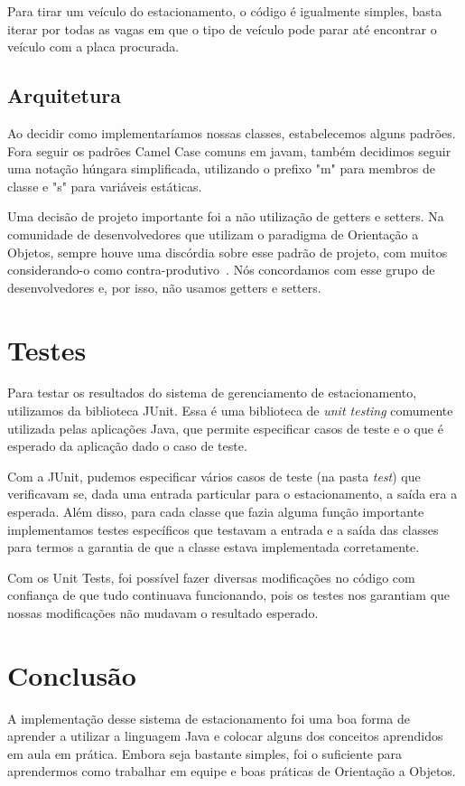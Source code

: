 \documentclass{article}
\begin{document}
Para tirar um veículo do estacionamento, o código é igualmente simples, basta iterar por todas as vagas em que o tipo de veículo pode parar até encontrar o veículo com a placa procurada.

\subsection{Arquitetura}
Ao decidir como implementaríamos nossas classes, estabelecemos alguns padrões. Fora seguir os padrões Camel Case comuns em javam, também decidimos seguir uma notação húngara simplificada, utilizando o prefixo "m" para membros de classe e "s" para variáveis estáticas. 

Uma decisão de projeto importante foi a não utilização de getters e setters. Na comunidade de desenvolvedores que utilizam o paradigma de Orientação a Objetos, sempre houve uma discórdia sobre esse padrão de projeto, com muitos considerando-o como contra-produtivo~\cite{evil}. Nós concordamos com esse grupo de desenvolvedores e, por isso, não usamos getters e setters.

\section{Testes}
Para testar os resultados do sistema de gerenciamento de estacionamento, utilizamos da biblioteca JUnit. Essa é uma biblioteca de \emph{unit testing} comumente utilizada pelas aplicações Java, que permite especificar casos de teste e o que é esperado da aplicação dado o caso de teste.

Com a JUnit, pudemos especificar vários casos de teste (na pasta \emph{test}) que verificavam se, dada uma entrada particular para o estacionamento, a saída era a esperada. Além disso, para cada classe que fazia alguma função importante implementamos testes específicos que testavam a entrada e a saída das classes para termos a garantia de que a classe estava implementada corretamente.

Com os Unit Tests, foi possível fazer diversas modificações no código com confiança de que tudo continuava funcionando, pois os testes nos garantiam que nossas modificações não mudavam o resultado esperado.

\section{Conclusão}
A implementação desse sistema de estacionamento foi uma boa forma de aprender a utilizar a linguagem Java e colocar alguns dos conceitos aprendidos em aula em prática. Embora seja bastante simples, foi o suficiente para aprendermos como trabalhar em equipe e boas práticas de Orientação a Objetos.

\nocite{*}


\end{document}
